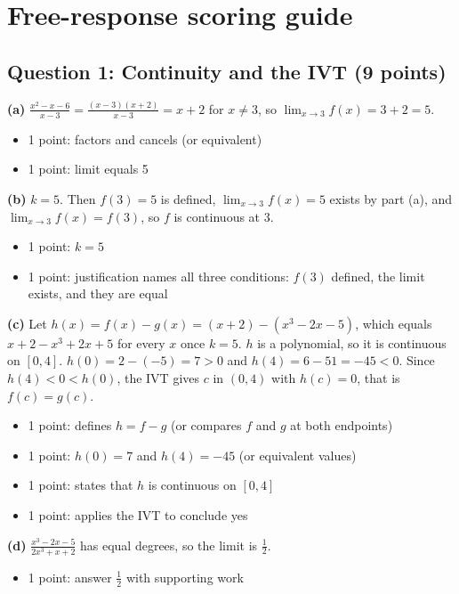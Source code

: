 \documentclass{apcalc}
\begin{document}
\section*{Free-response scoring guide}
\subsection*{Question 1: Continuity and the IVT (9 points)}
\textbf{(a)} $\frac{x^2-x-6}{x-3}=\frac{(x-3)(x+2)}{x-3}=x+2$ for $x\neq3$, so $\lim_{x\to3}f(x)=3+2=5$.
\begin{itemize}[leftmargin=1.6em,itemsep=0pt]
\item 1 point: factors and cancels (or equivalent)
\item 1 point: limit equals 5
\end{itemize}
\textbf{(b)} $k=5$. Then $f(3)=5$ is defined, $\lim_{x\to3}f(x)=5$ exists by part (a), and $\lim_{x\to3}f(x)=f(3)$, so $f$ is continuous at 3.
\begin{itemize}[leftmargin=1.6em,itemsep=0pt]
\item 1 point: $k=5$
\item 1 point: justification names all three conditions: $f(3)$ defined, the limit exists, and they are equal
\end{itemize}
\textbf{(c)} Let $h(x)=f(x)-g(x)=(x+2)-(x^3-2x-5)$, which equals $x+2-x^3+2x+5$ for every $x$ once $k=5$. $h$ is a polynomial, so it is continuous on $[0,4]$. $h(0)=2-(-5)=7>0$ and $h(4)=6-51=-45<0$. Since $h(4)<0<h(0)$, the IVT gives $c$ in $(0,4)$ with $h(c)=0$, that is $f(c)=g(c)$.
\begin{itemize}[leftmargin=1.6em,itemsep=0pt]
\item 1 point: defines $h=f-g$ (or compares $f$ and $g$ at both endpoints)
\item 1 point: $h(0)=7$ and $h(4)=-45$ (or equivalent values)
\item 1 point: states that $h$ is continuous on $[0,4]$
\item 1 point: applies the IVT to conclude yes
\end{itemize}
\textbf{(d)} $\frac{x^3-2x-5}{2x^3+x+2}$ has equal degrees, so the limit is $\frac12$.
\begin{itemize}[leftmargin=1.6em,itemsep=0pt]
\item 1 point: answer $\frac12$ with supporting work
\end{itemize}
\end{document}

